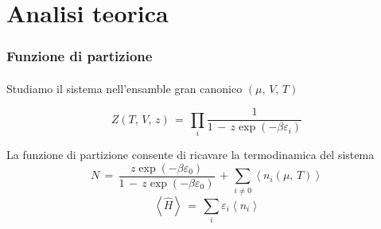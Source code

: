 \section{Analisi teorica}


\begin{frame}
  \frametitle{Funzione di partizione}
  \framesubtitle{}
  
  \centering
  Studiamo il sistema nell'ensamble gran canonico $\left(\mu,\,V,\,T\right)$

  $$
    Z\left(T,\,V,\,z\right)\,=\,\prod_i \frac{1}{1\,-\,z\exp{\left(-\beta \varepsilon_i \right)}}
  $$

  \vspace{20pt}
  \centering
  La funzione di partizione consente di ricavare la termodinamica del sistema
  $$
    N\,=\,\frac{z\exp{\left(-\beta \varepsilon_0 \right)}}{1\,-\,z\exp{\left(-\beta \varepsilon_0 \right)}}\,+\,\sum_{i \neq 0}\left<n_i\left(\mu,\,T\right)\right>
  $$
  $$
  \left<\hat{H}\right>\,=\,\sum_i \varepsilon_i \left<n_i\right>
  $$

\end{frame}


